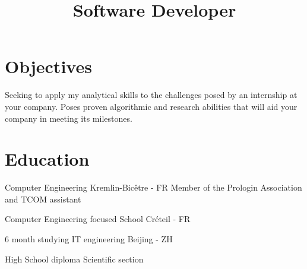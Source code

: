 \documentclass[10pt,a4paper,sans]{moderncv}
\title{Software Developer}
\newcommand\en[1]{#1}
\newcommand\fr[1]{}
\newcommand\full[1]{}
\begin{document}
\makecvtitle
\vspace*{-10mm}

\section{\fr{Objectifs}\en{Objectives}}
\fr{
    Actuellement en dernière année d'école d'ingénieur en informatique à
    l'EPITA.
    Je cherche un stage de 6 mois pour valoriser mon parcours ingénieur. Mon
    stage commencera en Février 2021.
    \full{
        Je cherche à appliquer mes compétences analytiques aux défis proposés
        par un stage dans votre entreprise.
        Mes capacités en Algorithmique et en recherche permettront à votre
        organisation d'atteindre ses objectifs.
    }
}
\en{
    Seeking to apply my analytical skills to the challenges posed by an
    internship at your company. Poses proven algorithmic and research abilities
    that will aid your company in meeting its milestones.
}

\section{\fr{\'Education}\en{Education}}
{\fr{\'Ecole d'ingénieur en informatique}\en{Computer Engineering}}
{Kremlin-Bicêtre - FR}
{\fr{Membre Prologin et Assistant TCOM}\en{Member of the Prologin Association and TCOM assistant}}{}

{\fr{Université d'informatique}\en{Computer Engineering focused School}}
{Créteil - FR}
{\fr{Licence d'informatique}}{}

\full{\cventry{2018}{Google}{Q{\&}A Meeting with an Google Software Engineer.}
{FR}{}{}}

{\fr{6 mois d'étude informatique}\en{6 month studying IT engineering}}
{\fr{Pékin}\en{Beijing} - ZH}{}{}

\full{\cventry{2014}{BNSSA et PSE1}{\fr{Surveillant de baignade}\en{lifeguard}}{}{}{}}

{\fr{Baccalauréat}\en{High School diploma}}
{\fr{Série Scientifique}\en{Scientific section}}{}
{}{}
\end{document}
